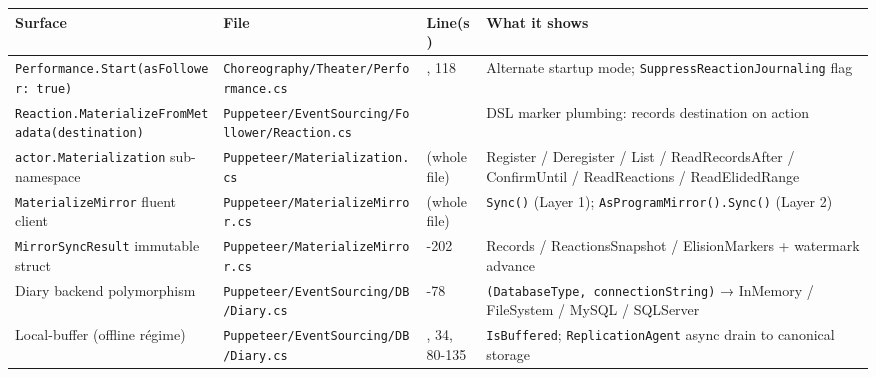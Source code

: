\documentclass[
]{article}
\newcounter{none} %
\begin{document}
{\def\LTcaptype{none} %
\begin{longtable}[]{@{}
  >{\raggedright\arraybackslash}p{}
  >{\raggedright\arraybackslash}p{}
  >{\raggedright\arraybackslash}p{}
  >{\raggedright\arraybackslash}p{}@{}}
\toprule\noalign{}
\begin{minipage}[b]{\linewidth}\raggedright
Surface
\end{minipage} & \begin{minipage}[b]{\linewidth}\raggedright
File
\end{minipage} & \begin{minipage}[b]{\linewidth}\raggedright
Line(s)
\end{minipage} & \begin{minipage}[b]{\linewidth}\raggedright
What it shows
\end{minipage} \\
\midrule\noalign{}
\endhead
\bottomrule\noalign{}
\endlastfoot
\texttt{Performance.Start(asFollower:\ true)} &
\texttt{Choreography/Theater/Performance.cs} & 100, 118 & Alternate
startup mode; \texttt{SuppressReactionJournaling} flag \\
\texttt{Reaction.MaterializeFromMetadata(destination)} &
\texttt{Puppeteer/EventSourcing/Follower/Reaction.cs} & 669 & DSL marker
plumbing: records destination on action \\
\texttt{actor.Materialization} sub-namespace &
\texttt{Puppeteer/Materialization.cs} & (whole file) & Register /
Deregister / List / ReadRecordsAfter / ConfirmUntil / ReadReactions /
ReadElidedRange \\
\texttt{MaterializeMirror} fluent client &
\texttt{Puppeteer/MaterializeMirror.cs} & (whole file) & \texttt{Sync()}
(Layer 1); \texttt{AsProgramMirror().Sync()} (Layer 2) \\
\texttt{MirrorSyncResult} immutable struct &
\texttt{Puppeteer/MaterializeMirror.cs} & 170-202 & Records /
ReactionsSnapshot / ElisionMarkers + watermark advance \\
Diary backend polymorphism &
\texttt{Puppeteer/EventSourcing/DB/Diary.cs} & 53-78 &
\texttt{(DatabaseType,\ connectionString)} → InMemory / FileSystem /
MySQL / SQLServer \\
Local-buffer (offline régime) &
\texttt{Puppeteer/EventSourcing/DB/Diary.cs} & 28, 34, 80-135 &
\texttt{IsBuffered}; \texttt{ReplicationAgent} async drain to canonical
storage \\
\end{longtable}
}
\end{document}
